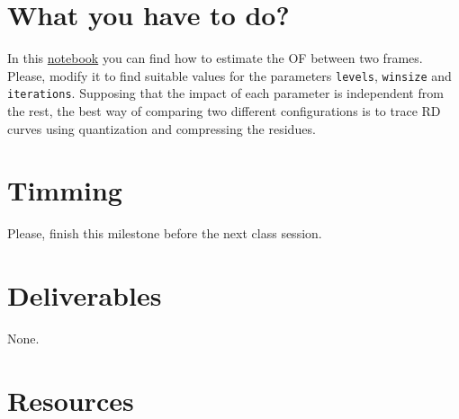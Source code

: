 \section{What you have to do?}

In this
\href{https://github.com/Sistemas-Multimedia/Sistemas-Multimedia.github.io/blob/master/milestones/10-ME/optical_flow.ipynb}{notebook}
you can find how to estimate the OF between two frames. Please, modify
it to find suitable values for the parameters \texttt{levels},
\texttt{winsize} and \texttt{iterations}. Supposing that the impact of
each parameter is independent from the rest, the best way of comparing
two different configurations is to trace RD curves using quantization
and compressing the residues.

\section{Timming}

Please, finish this milestone before the next class session.

\section{Deliverables}

None.

\section{Resources}

\renewcommand{\addcontentsline}[3]{}%

